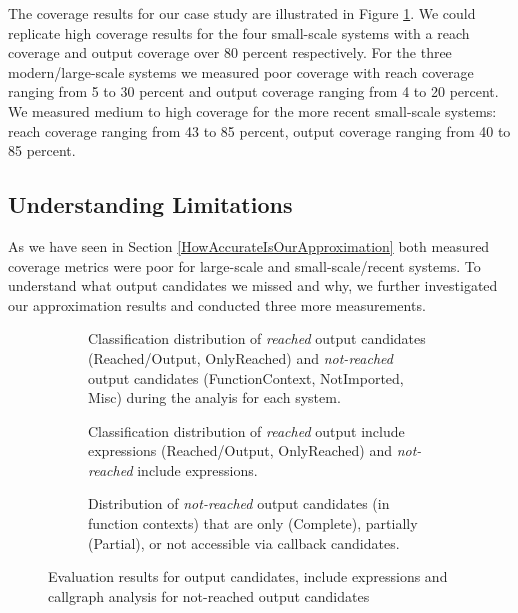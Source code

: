 \documentclass[sigconf]{acmart}
\begin{document}
The coverage results for our case study are illustrated in Figure
\ref{coverage}. We could replicate high coverage results for the four small-scale systems with a reach
coverage and output coverage over 80 percent respectively. For the three
modern/large-scale systems we measured poor coverage with reach coverage
ranging from 5 to 30 percent and output coverage ranging from 4 to 20 percent.
We measured medium to high coverage for the more recent small-scale systems:
reach coverage ranging from 43 to 85 percent, output coverage ranging from 40
to 85 percent.

\subsection{Understanding Limitations} \label{sec:understanding_limitations}
As we have seen in Section \ref{HowAccurateIsOurApproximation} both measured
coverage metrics were poor for large-scale and small-scale/recent systems. To
understand what output candidates we missed and why, we further investigated
our approximation results and conducted three more measurements.

\begin{figure}[h!]
	\begin{subfigure}[center]{0.48\textwidth}
		
		\caption{
		Classification distribution of \emph{reached} output candidates
		(Reached/Output, OnlyReached) and \emph{not-reached} output candidates
		(FunctionContext, NotImported, Misc) during the analyis for each system.
		\label{coverage}}
	\end{subfigure}
	\vspace{1mm}
	
	\begin{subfigure}[center]{0.48\textwidth}
		
		\caption{
			Classification distribution of \emph{reached} output include expressions
			(Reached/Output, OnlyReached) and \emph{not-reached} include expressions.
			\label{fig:include_coverage_results}
		}
	\end{subfigure}
	\vspace{1mm}
	
	\begin{subfigure}[center]{0.48\textwidth}
		
		\caption{
			Distribution of \emph{not-reached} output candidates (in function contexts)
			that are only (Complete), partially (Partial), or not accessible via callback candidates. 
			\label{fig:output_candidate_explanation}
		}
		
	\end{subfigure}
	\caption{Evaluation results for output candidates, include expressions and
	callgraph analysis for not-reached output candidates}
\end{figure}
\end{document}

